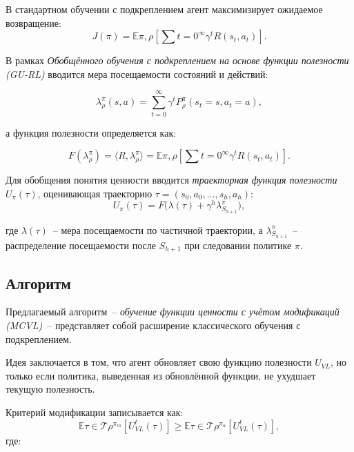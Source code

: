В стандартном обучении с подкреплением агент максимизирует ожидаемое возвращение:
\begin{equation}
J(\pi) = \mathbb{E}{\pi, \rho} \left[ \sum{t=0}^{\infty} \gamma^t R(s_t, a_t) \right].
\end{equation}

В рамках \emph{Обобщённого обучения с подкреплением на основе функции полезности (GU-RL)} вводится мера посещаемости состояний и действий:

\begin{equation}
\lambda_\rho^\pi(s,a) = \sum_{t=0}^{\infty} \gamma^t P_\rho^\pi(s_t = s, a_t = a),
\end{equation}

а функция полезности определяется как:

\begin{equation}
F(\lambda_\rho^\pi) = \langle R, \lambda_\rho^\pi \rangle = \mathbb{E}{\pi, \rho} \left[ \sum{t=0}^{\infty} \gamma^t R(s_t, a_t) \right].
\end{equation}

Для обобщения понятия ценности вводится \emph{траекторная функция полезности} $U_\pi(\tau)$, оценивающая траекторию $\tau = (s_0, a_0, \ldots, s_h, a_h)$:
\begin{equation}
U_\pi(\tau) = F \big( \lambda(\tau) + \gamma^h \lambda_{S_{h+1}}^\pi \big),
\end{equation}

где $\lambda(\tau)$~-- мера посещаемости по частичной траектории,
а $\lambda_{S_{h+1}}^\pi$~-- распределение посещаемости после $S_{h+1}$ при следовании политике $\pi$.


\subsection{Алгоритм}

Предлагаемый алгоритм~-- \emph{обучение функции ценности с учётом модификаций (MCVL)}~-- представляет собой расширение классического обучения с подкреплением.

Идея заключается в том, что агент обновляет свою функцию полезности $U_{VL}$, но только если политика, выведенная из обновлённой функции, не ухудшает текущую полезность.

Критерий модификации записывается как:
\begin{equation}
\mathbb{E}{\tau \in \mathcal{T}\rho^{\pi_m}} [U_{VL}^t(\tau)] \ge
\mathbb{E}{\tau \in \mathcal{T}\rho^{\pi_u}} [U_{VL}^t(\tau)],
\end{equation}
где:

